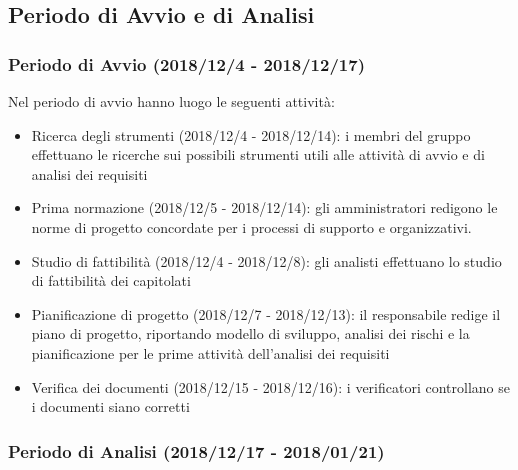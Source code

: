 \subsection{Periodo di Avvio e di Analisi }
	\subsubsection{Periodo di Avvio (2018/12/4 - 2018/12/17)}
		Nel periodo di avvio hanno luogo le seguenti attività:
		\begin{itemize}
			\item Ricerca degli strumenti (2018/12/4 - 2018/12/14): i membri del gruppo effettuano le ricerche sui possibili strumenti utili alle attività di avvio e di analisi dei requisiti
			\item Prima normazione (2018/12/5 - 2018/12/14): gli amministratori redigono le norme di progetto concordate per i processi di supporto e organizzativi.
			\item Studio di fattibilità (2018/12/4 - 2018/12/8): gli analisti effettuano lo studio di fattibilità dei capitolati
			\item Pianificazione di progetto (2018/12/7 - 2018/12/13): il responsabile redige il piano di progetto, riportando modello di sviluppo, analisi dei rischi e la pianificazione per le prime attività dell'analisi dei requisiti
			\item Verifica dei documenti (2018/12/15 - 2018/12/16): i verificatori controllano se i documenti siano corretti
		\end{itemize}
		
	\subsubsection{Periodo di Analisi (2018/12/17 - 2018/01/21)}	
